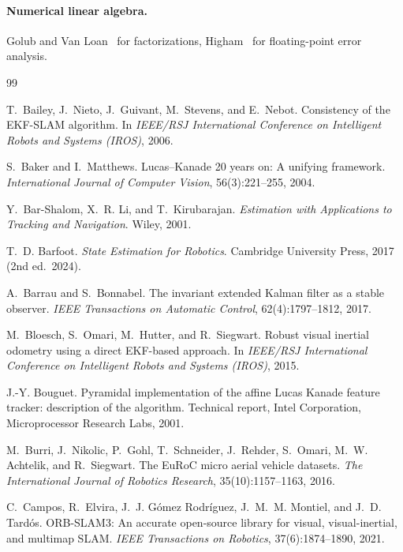 \paragraph{Numerical linear algebra.} Golub and Van Loan~\cite{golub2013} for factorizations, Higham~\cite{higham2002} for floating-point
error analysis.

\renewcommand{\bibname}{References}
\begin{thebibliography}{99}
\small

 T.~Bailey, J.~Nieto, J.~Guivant, M.~Stevens, and E.~Nebot. Consistency of the EKF-SLAM algorithm. In \emph{IEEE/RSJ International Conference on Intelligent Robots and Systems (IROS)}, 2006.

 S.~Baker and I.~Matthews. Lucas--Kanade 20 years on: A unifying framework. \emph{International Journal of Computer Vision}, 56(3):221--255, 2004.

 Y.~Bar-Shalom, X.~R. Li, and T.~Kirubarajan. \emph{Estimation with Applications to Tracking and Navigation}. Wiley, 2001.

 T.~D. Barfoot. \emph{State Estimation for Robotics}. Cambridge University Press, 2017 (2nd ed.\ 2024).

 A.~Barrau and S.~Bonnabel. The invariant extended Kalman filter as a stable observer. \emph{IEEE Transactions on Automatic Control}, 62(4):1797--1812, 2017.

 M.~Bloesch, S.~Omari, M.~Hutter, and R.~Siegwart. Robust visual inertial odometry using a direct EKF-based approach. In \emph{IEEE/RSJ International Conference on Intelligent Robots and Systems (IROS)}, 2015.

 J.-Y. Bouguet. Pyramidal implementation of the affine Lucas Kanade feature tracker: description of the algorithm. Technical report, Intel Corporation, Microprocessor Research Labs, 2001.

 M.~Burri, J.~Nikolic, P.~Gohl, T.~Schneider, J.~Rehder, S.~Omari, M.~W. Achtelik, and R.~Siegwart. The EuRoC micro aerial vehicle datasets. \emph{The International Journal of Robotics Research}, 35(10):1157--1163, 2016.

 C.~Campos, R.~Elvira, J.~J. G\'omez Rodr\'iguez, J.~M.~M. Montiel, and J.~D. Tard\'os. ORB-SLAM3: An accurate open-source library for visual, visual-inertial, and multimap SLAM. \emph{IEEE Transactions on Robotics}, 37(6):1874--1890, 2021.


\end{thebibliography}
